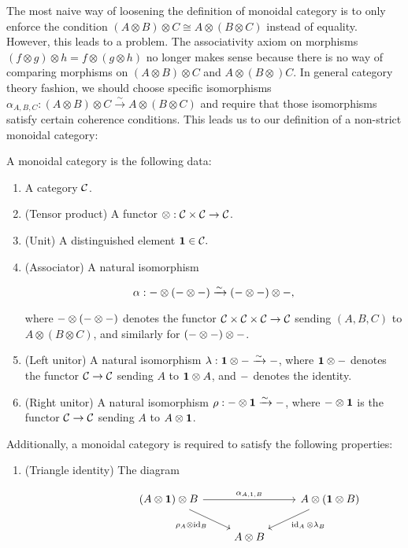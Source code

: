 The most naive way of loosening the definition of monoidal category is to only enforce the condition $(A\otimes B)\otimes C\cong A\otimes (B\otimes C)$ instead of equality. However, this leads to a problem. The associativity axiom on morphisms $(f\otimes g)\otimes h = f\otimes (g\otimes h)$  no longer makes sense because there is no way of comparing morphisms on $(A\otimes B)\otimes C$ and $A\otimes (B\otimes )C$. In general category theory fashion, we should choose specific isomorphisms $\alpha_{A,B,C}:(A\otimes B)\otimes C\xrightarrow{\sim} A\otimes (B\otimes C)$ and require that  those isomorphisms satisfy certain coherence conditions. This leads us to our definition of a non-strict monoidal category:

\begin{defn} A monoidal category is the following data:

\begin{enumerate}
\item A category ${\mathcal C}$.
\item (Tensor product) A functor $\otimes: {\mathcal C} \times {\mathcal C} \to {\mathcal C}$.
\item (Unit) A distinguished element ${\mathbf 1}\in {\mathcal C}.$
\item (Associator) A natural isomorphism

$$\alpha: \--\otimes (\-- \otimes \--) \xrightarrow{\sim} (\--\otimes \--)\otimes \-- , $$

where $\-- \otimes (\--\otimes \--)$ denotes the functor ${\mathcal C}\times {\mathcal C}\times {\mathcal C}\to{\mathcal C}$ sending $(A,B,C)$ to $A\otimes (B\otimes C)$, and similarly for $(\-- \otimes \-- )\otimes\--$.
\item (Left unitor) A natural isomorphism $\lambda: {\mathbf 1}\otimes \-- \xrightarrow{\sim} \--$, where ${\mathbf 1}\otimes \--$ denotes the functor ${\mathcal C}\to {\mathcal C}$ sending $A$ to ${\mathbf 1}\otimes A$, and $\--$ denotes the identity.
\item (Right unitor) A natural isomorphism $\rho: \--\otimes {\mathbf 1} \xrightarrow{\sim} \--$, where $\--\otimes {\mathbf 1}$ is the functor ${\mathcal C}\to {\mathcal C}$ sending $A$ to $A\otimes {\mathbf 1}$.
\end{enumerate}

Additionally, a monoidal category is required to satisfy the following properties:

\begin{enumerate}
\item (Triangle identity) The diagram

\[\begin{tikzcd}
	{} & {} & {\left(A\otimes \bone\right)\otimes B} & {} & {A\otimes (\bone\otimes B)} \\
	&& {} & {A\otimes B} \\
	&&&& {}
	\arrow["{\alpha_{A,1,B}}", from=1-3, to=1-5]
	\arrow["{\rho_A\otimes \id_B}"', from=1-3, to=2-4]
	\arrow["{\id_A\otimes \lambda_B}", from=1-5, to=2-4]
\end{tikzcd}\]


\end{enumerate}
\end{defn}
